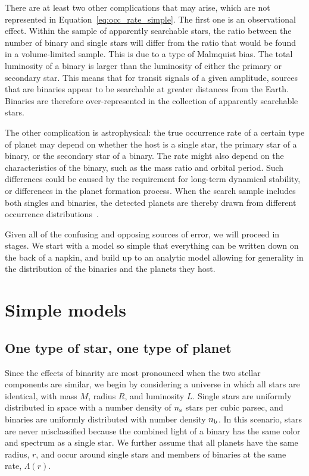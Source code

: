 \documentclass[12pt,modern]{aastex61}
\newcommand{\s}{_{\rm s}}
\renewcommand{\b}{_{\rm b}}
\begin{document}
There are at least two other complications that may arise, which are
not represented in Equation~\ref{eq:occ_rate_simple}.  The first one
is an observational effect. Within the sample of apparently searchable
stars, the ratio between the number of binary and single stars will
differ from the ratio that would be found in a volume-limited sample.
This is due to a type of Malmquist bias.  The total luminosity of a
binary is larger than the luminosity of either the primary or
secondary star.  This means that for transit signals of a given
amplitude, sources that are binaries appear to be searchable at
greater distances from the Earth.  Binaries are therefore
over-represented in the collection of apparently searchable stars.

The other complication is astrophysical: the true occurrence rate of a
certain type of planet may depend on whether the host is a single
star, the primary star of a binary, or the secondary star of a binary.
The rate might also depend on the characteristics of the binary, such
as the mass ratio and orbital period.  Such differences could be
caused by the requirement for long-term dynamical stability, or
differences in the planet formation process.  When the search sample
includes both singles and binaries, the detected planets are thereby
drawn from different occurrence distributions~\citep[see][]{
  wang_occurrence_2015,kraus_impact_2016}.

Given all of the confusing and opposing sources of error, we will
proceed in stages.  We start with a model so simple that everything
can be written down on the back of a napkin, and build up to an
analytic model allowing for generality in the distribution of the
binaries and the planets they host.  



\section{Simple models}
\label{sec:simplest}

\subsection{One type of star, one type of planet}
\label{sec:model_1}

Since the effects of binarity are most pronounced when the two stellar
components are similar, we begin by considering a universe in which
all stars are identical, with mass $M$, radius $R$, and luminosity
$L$.  Single stars are uniformly distributed in space with a number
density of $n\s$ stars per cubic parsec, and binaries are uniformly
distributed with number density $n\b$.  In this scenario, stars are
never misclassified because the combined light of a binary has the
same color and spectrum as a single star.  We further assume that all
planets have the same radius, $r$, and occur around single stars and
members of binaries at the same rate, $\Lambda(r)$.
\end{document}
